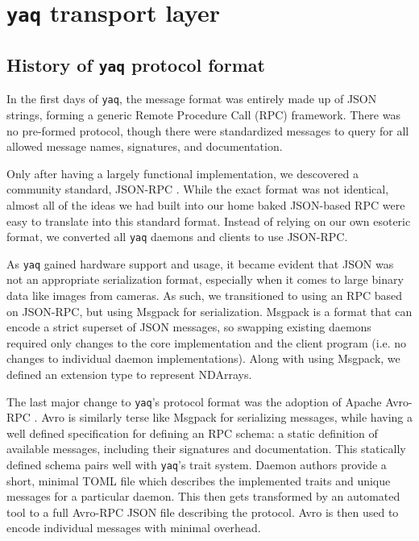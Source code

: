 \documentclass[11pt, full]{article}
\newcommand\yaq{\texttt{yaq}}
\let\stdsection\section
\renewcommand\section{\clearpage\stdsection}
\begin{document}
\clearpage


\section{\yaq{} transport layer}

\subsection{History of \yaq{} protocol format}

In the first days of \yaq{}, the message format was entirely made up of JSON strings, forming a generic Remote Procedure Call (RPC) framework.
There was no pre-formed protocol, though there were standardized messages to query for all allowed message names, signatures, and documentation.

Only after having a largely functional implementation, we descovered a community standard, JSON-RPC \cite{jsonrpc}.
While the exact format was not identical, almost all of the ideas we had built into our home baked JSON-based RPC were easy to translate into this standard format.
Instead of relying on our own esoteric format, we converted all \yaq{} daemons and clients to use JSON-RPC.

As \yaq{} gained hardware support and usage, it became evident that JSON was not an appropriate serialization format, especially when it comes to large binary data like images from cameras.
As such, we transitioned to using an RPC based on JSON-RPC, but using Msgpack \cite{msgpack} for serialization.
Msgpack is a format that can encode a strict superset of JSON messages, so swapping existing daemons required only changes to the core implementation and the client program (i.e. no changes to individual daemon implementations).
Along with using Msgpack, we defined an extension type to represent NDArrays.

The last major change to \yaq{}'s protocol format was the adoption of Apache Avro-RPC \cite{AvroSpecification}.
Avro is similarly terse like Msgpack for serializing messages, while having a well defined specification for defining an RPC schema: a static definition of available messages, including their signatures and documentation.
This statically defined schema pairs well with \yaq{}'s trait system.
Daemon authors provide a short, minimal TOML file which describes the implemented traits and unique messages for a particular daemon.
This then gets transformed by an automated tool to a full Avro-RPC JSON file describing the protocol.
Avro is then used to encode individual messages with minimal overhead.
\end{document}
